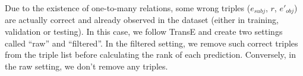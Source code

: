 Due to the existence of one-to-many relations, some wrong triples ($e_{subj}$, $r$, $e'_{obj}$)
are actually correct and already observed
in the dataset (either in training, validation or testing).
In this case, we follow TransE \cite{bordes2013translating}
and create two settings called ``raw'' and ``filtered''.
In the filtered setting, we remove such correct triples from the triple list
before calculating the rank of each prediction.
Conversely, in the raw setting, we don't remove any triples.


%
%





